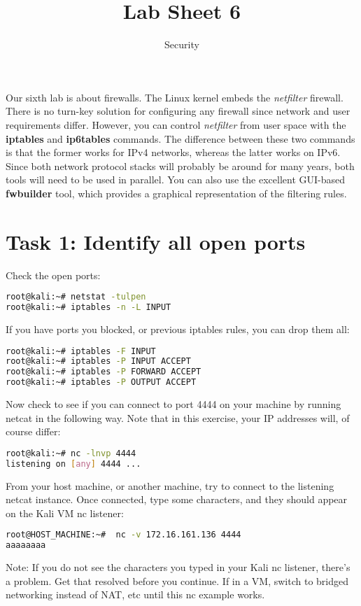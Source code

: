 \documentclass{article}
\title{Lab Sheet 6}
\date{Security}
\begin{document}
\maketitle
Our sixth lab is about firewalls. The Linux kernel embeds the \textit{netfilter} firewall. There is no turn-key solution for configuring any firewall since network and user requirements differ. However, you can control \textit{netfilter} from user space with the \textbf{iptables} and \textbf{ip6tables} commands. The difference between these two commands is that the former works for IPv4 networks, whereas the latter works on IPv6. Since both network protocol stacks will probably be around for many years, both tools will need to be used in parallel. You can also use the excellent GUI-based \textbf{fwbuilder} tool, which provides a graphical representation of the filtering rules.

\section{Task 1: Identify all open ports}
Check the open ports:
\begin{lstlisting}[language=bash]
root@kali:~# netstat -tulpen
root@kali:~# iptables -n -L INPUT
\end{lstlisting}
If you have ports you blocked, or previous iptables rules, you can drop them all:
\begin{lstlisting}[language=bash]
root@kali:~# iptables -F INPUT
root@kali:~# iptables -P INPUT ACCEPT
root@kali:~# iptables -P FORWARD ACCEPT
root@kali:~# iptables -P OUTPUT ACCEPT
\end{lstlisting}
Now check to see if you can connect to port 4444 on your machine by running netcat in the following way. Note that in this exercise, your IP addresses will, of course differ:
\begin{lstlisting}[language=bash]
root@kali:~# nc -lnvp 4444
listening on [any] 4444 ...
\end{lstlisting}
From your host machine, or another machine, try to connect to the listening netcat instance. Once connected, type some characters, and they should appear on the Kali VM nc listener:
\begin{lstlisting}[language=bash]
root@HOST_MACHINE:~#  nc -v 172.16.161.136 4444
aaaaaaaa
\end{lstlisting}
Note: If you do not see the characters you typed in your Kali nc listener, there's a problem. Get that resolved before you continue. If in a VM, switch to bridged networking instead of NAT, etc until this nc example works.
\end{document}
